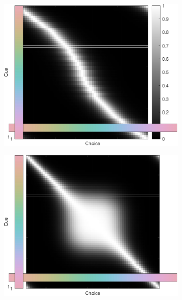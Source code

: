 \begin{figure}
    \centering
    \begin{subfigure}[b]{0.49\textwidth}
         \centering
         \caption{}
         \includegraphics[width=\textwidth]{../../Figures/working/justBias.pdf}
         \label{fig:JustBias}
    \end{subfigure}
    \hfill
    \begin{subfigure}[b]{0.49\textwidth}
         \centering
         \caption{}
         \includegraphics[width=\textwidth]{../../Figures/working/justColSpace.pdf}         
         \label{fig:JustColSpace}
    \end{subfigure}


\end{figure}
